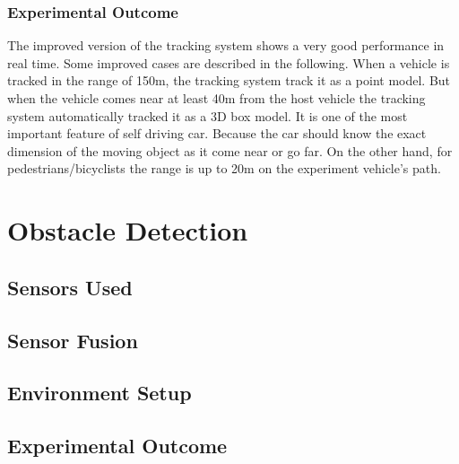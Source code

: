 \subsubsection{Experimental Outcome}
The improved version of the tracking system shows a very good performance in real time\cite{Cho_2014}. Some improved cases are described in the following. When a vehicle is tracked in the range of 150m, the tracking system track it as a point model. But when the vehicle comes near at least 40m from the host vehicle the tracking system automatically tracked it as a 3D box model. It is one of the most important feature of self driving car. Because the car should know the exact dimension of the moving object as it come near or go far\cite{Cho_2014}. On the other hand, for pedestrians/bicyclists the range is up to 20m on the experiment vehicle's path.



\section{Obstacle Detection}

\subsection{Sensors Used}

\subsection{Sensor Fusion}

\subsection{Environment Setup}

\subsection{Experimental Outcome}


